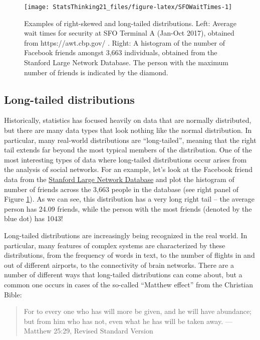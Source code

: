 \documentclass[12pt,]{book}
\theoremstyle{definition}
\theoremstyle{definition}
\theoremstyle{definition}
\theoremstyle{remark}
\begin{document}
\begin{figure}
\texttt{[image: StatsThinking21\_files/figure-latex/SFOWaitTimes-1]} \caption{Examples of right-skewed and long-tailed distributions.  Left: Average wait times for security at SFO Terminal A (Jan-Oct 2017), obtained from https://awt.cbp.gov/ .  Right: A histogram of the number of Facebook friends amongst 3,663 individuals, obtained from the Stanford Large Network Database. The person with the maximum number of friends is indicated by the diamond.}\label{fig:SFOWaitTimes}
\end{figure}

\hypertarget{long-tailed-distributions}{%
\subsection{Long-tailed distributions}\label{long-tailed-distributions}}

Historically, statistics has focused heavily on data that are normally distributed, but there are many data types that look nothing like the normal distribution. In particular, many real-world distributions are ``long-tailed'', meaning that the right tail extends far beyond the most typical members of the distribution. One of the most interesting types of data where long-tailed distributions occur arises from the analysis of social networks. For an example, let's look at the Facebook friend data from the \href{https://snap.stanford.edu/data/egonets-Facebook.html}{Stanford Large Network Database} and plot the histogram of number of friends across the 3,663 people in the database (see right panel of Figure \ref{fig:SFOWaitTimes}). As we can see, this distribution has a very long right tail -- the average person has 24.09 friends, while the person with the most friends (denoted by the blue dot) has 1043!

Long-tailed distributions are increasingly being recognized in the real world. In particular, many features of complex systems are characterized by these distributions, from the frequency of words in text, to the number of flights in and out of different airports, to the connectivity of brain networks. There are a number of different ways that long-tailed distributions can come about, but a common one occurs in cases of the so-called ``Matthew effect'' from the Christian Bible:

\begin{quote}
For to every one who has will more be given, and he will have abundance; but from him who has not, even what he has will be taken away. --- Matthew 25:29, Revised Standard Version
\end{quote}
\end{document}

